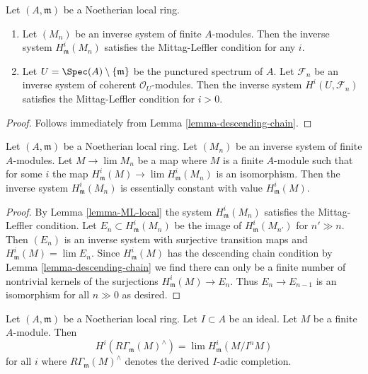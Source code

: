 \begin{lemma}
\label{lemma-ML-local}
Let $(A, \mathfrak m)$ be a Noetherian local ring.
\begin{enumerate}
\item Let $(M_n)$ be an inverse system of finite $A$-modules. Then the
inverse system $H^i_\mathfrak m(M_n)$ satisfies the Mittag-Leffler
condition for any $i$.
\item Let $U = \Spec(A) \setminus \{\mathfrak m\}$ be the
punctured spectrum of $A$.
Let $\mathcal{F}_n$ be an inverse system of
coherent $\mathcal{O}_U$-modules.
Then the inverse system $H^i(U, \mathcal{F}_n)$
satisfies the Mittag-Leffler condition for $i > 0$.
\end{enumerate}
\end{lemma}

\begin{proof}
Follows immediately from Lemma \ref{lemma-descending-chain}.
\end{proof}

\begin{lemma}
\label{lemma-terrific}
Let $(A, \mathfrak m)$ be a Noetherian local ring.
Let $(M_n)$ be an inverse system of finite $A$-modules.
Let $M \to \lim M_n$ be a map where $M$ is a finite $A$-module
such that for some $i$ the map
$H^i_\mathfrak m(M) \to \lim H^i_\mathfrak m(M_n)$
is an isomorphism.
Then the inverse system $H^i_\mathfrak m(M_n)$
is essentially constant with value $H^i_\mathfrak m(M)$.
\end{lemma}

\begin{proof}
By Lemma \ref{lemma-ML-local} the system $H^i_\mathfrak m(M_n)$
satisfies the Mittag-Leffler condition. Let $E_n \subset H^i_\mathfrak m(M_n)$
be the image of $H^i_\mathfrak m(M_{n'})$ for $n' \gg n$.
Then $(E_n)$ is an inverse system with surjective transition maps
and $H^i_\mathfrak m(M) = \lim E_n$. Since $H^i_\mathfrak m(M)$
has the descending chain condition by
Lemma \ref{lemma-descending-chain}
we find there can only be a finite number of nontrivial
kernels of the surjections $H^i_\mathfrak m(M) \to E_n$.
Thus $E_n \to E_{n - 1}$ is an isomorphism for all $n \gg 0$
as desired.
\end{proof}

\begin{lemma}
\label{lemma-local-cohomology-derived-completion}
Let $(A, \mathfrak m)$ be a Noetherian local ring.
Let $I \subset A$ be an ideal. Let $M$ be a finite $A$-module.
Then
$$
H^i(R\Gamma_\mathfrak m(M)^\wedge) = \lim H^i_\mathfrak m(M/I^nM)
$$
for all $i$ where $R\Gamma_\mathfrak m(M)^\wedge$ denotes
the derived $I$-adic completion.
\end{lemma}

